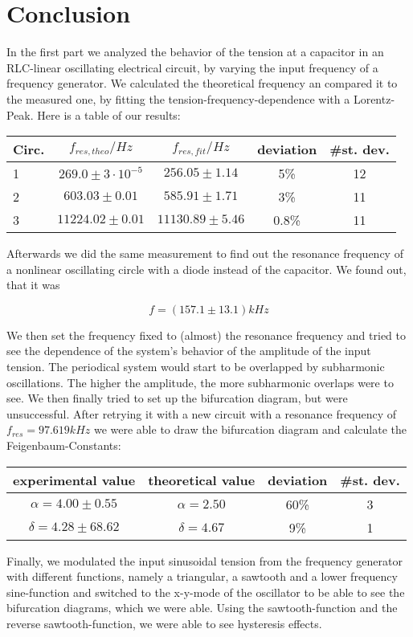 \clearpage
\section{Conclusion}

In the first part we analyzed the behavior of the tension at a capacitor in an RLC-linear oscillating electrical circuit, by varying the input frequency of a frequency generator. We calculated the theoretical frequency an compared it to the measured one, by fitting the tension-frequency-dependence with a Lorentz-Peak. Here is a table of our results:

\begin{center}
\begin{tabular}{l c c c c}
Circ. & $f_{res,theo}/Hz$ & $f_{res,fit}/Hz$ & deviation & \#st. dev.\\ \hline
1 & $269.0\pm 3\cdot10^{-5}$ & $256.05\pm1.14$ & 5\% & 12\\
2 & $603.03\pm0.01$ & $585.91\pm1.71$ & 3\% & 11\\
3 & $11224.02\pm0.01$ & $11130.89\pm5.46$ & 0.8\% & 11\\
\end{tabular}
\end{center}

Afterwards we did the same measurement to find out the resonance frequency of a nonlinear oscillating circle with a diode instead of the capacitor. We found out, that it was 

$$f=(157.1\pm13.1)kHz$$

We then set the frequency fixed to (almost) the resonance frequency and tried to see the dependence of the system's behavior of the amplitude of the input tension. The periodical system would start to be overlapped by subharmonic oscillations. The higher the amplitude, the more subharmonic overlaps were to see. We then finally tried to set up the bifurcation diagram, but were unsuccessful. After retrying it with a new circuit with a resonance frequency of $f_{res}=97.619 kHz$ we were able to draw the bifurcation diagram and calculate the Feigenbaum-Constants:

\begin{center}
\begin{tabular}{c c c c}
experimental value & theoretical value & deviation & \#st. dev.\\ \hline
$\alpha = 4.00\pm0.55 $ & $\alpha = 2.50$ & 60\% & 3\\
$\delta = 4.28 \pm68.62$ & $\delta = 4.67$ & 9\% & 1\\
\end{tabular}
\end{center}

Finally, we modulated the input sinusoidal tension from the frequency generator with different functions, namely a triangular, a sawtooth and a lower frequency sine-function and switched to the x-y-mode of the oscillator to be able to see the bifurcation diagrams, which we were able. Using the sawtooth-function and the reverse sawtooth-function, we were able to see hysteresis effects.